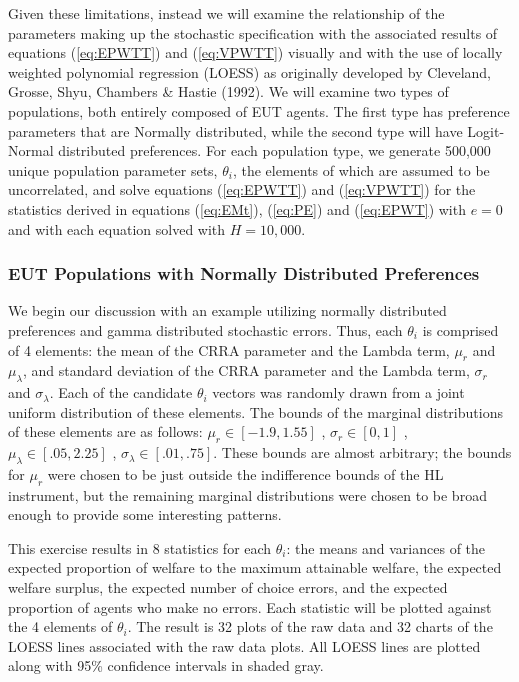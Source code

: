 \documentclass[../main.tex]{subfiles}
\begin{document}
Given these limitations, instead we will examine the relationship of the parameters making up the stochastic specification with the associated results of equations (\ref{eq:EPWTT}) and (\ref{eq:VPWTT}) visually and with the use of locally weighted polynomial regression (LOESS) as originally developed by Cleveland, Grosse, Shyu, Chambers \& Hastie (1992).
We will examine two types of populations, both entirely composed of EUT agents.
The first type has preference parameters that are Normally distributed, while the second type will have Logit-Normal distributed preferences.
For each population type, we generate 500,000 unique population parameter sets, $\theta_i$, the elements of which are assumed to be uncorrelated, and solve equations (\ref{eq:EPWTT}) and (\ref{eq:VPWTT}) for the statistics derived in equations (\ref{eq:EMt}), (\ref{eq:PE}) and (\ref{eq:EPWT}) with $e=0$ and with each equation solved with $H=10,000$.

\subsubsection{EUT Populations with Normally Distributed Preferences}

We begin our discussion with an example utilizing normally distributed preferences and gamma distributed stochastic errors.
Thus, each $\theta_i$ is comprised of 4 elements: the mean of the CRRA parameter and the Lambda term, $\mu_r$ and $\mu_\lambda$, and standard deviation of the CRRA parameter and the Lambda term, $\sigma_r$ and $\sigma_\lambda$. Each of the candidate $\theta_i$ vectors was randomly drawn from a joint uniform distribution of these elements.
The bounds of the marginal distributions of these elements are as follows: $\mu_r \in [-1.9 , 1.55 ]$ , $\sigma_r \in [0 , 1]$ , $\mu_\lambda \in [.05 , 2.25]$ , $\sigma_\lambda \in [.01 , .75]$. 
These bounds are almost arbitrary; the bounds for $\mu_r$ were chosen to be just outside the indifference bounds of the HL instrument, but the remaining marginal distributions were chosen to be broad enough to provide some interesting patterns.

This exercise results in 8 statistics for each $\theta_i$: the means and variances of the expected proportion of welfare to the maximum attainable welfare, the expected welfare surplus, the expected number of choice errors, and the expected proportion of agents who make no errors.
Each statistic will be plotted against the 4 elements of $\theta_i$.
The result is 32 plots of the raw data and 32 charts of the LOESS lines associated with the raw data plots.
All LOESS lines are plotted along with 95\% confidence intervals in shaded gray.
\end{document}

